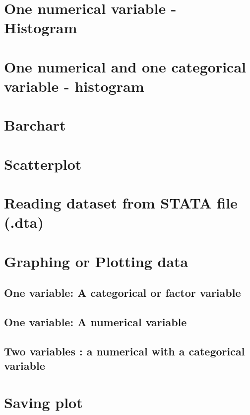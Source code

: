 \documentclass[]{book}
\theoremstyle{definition}
\theoremstyle{definition}
\theoremstyle{definition}
\theoremstyle{remark}
\begin{document}
\section{One numerical variable -
Histogram}\label{one-numerical-variable---histogram}

\section{One numerical and one categorical variable -
histogram}\label{one-numerical-and-one-categorical-variable---histogram}

\section{Barchart}\label{barchart}

\section{Scatterplot}\label{scatterplot-1}

\section{Reading dataset from STATA file
(.dta)}\label{reading-dataset-from-stata-file-.dta}

\section{Graphing or Plotting data}\label{graphing-or-plotting-data}

\subsection{One variable: A categorical or factor
variable}\label{one-variable-a-categorical-or-factor-variable-1}

\subsection{One variable: A numerical
variable}\label{one-variable-a-numerical-variable-3}

\subsection{Two variables : a numerical with a categorical
variable}\label{two-variables-a-numerical-with-a-categorical-variable}

\section{Saving plot}\label{saving-plot}
\end{document}
